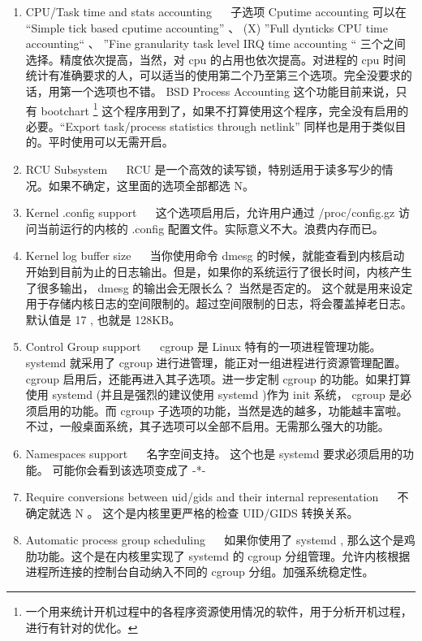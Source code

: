 \begin{enumerate}
\item CPU/Task time and stats accounting ~~ 子选项 Cputime accounting 可以在  “Simple tick based cputime accounting”    、   (X) ”Full dynticks CPU time accounting“      、 ”Fine granularity task level IRQ time accounting “ 三个之间选择。精度依次提高，当然，对 cpu 的占用也依次提高。对进程的 cpu 时间统计有准确要求的人，可以适当的使用第二个乃至第三个选项。完全没要求的话，用第一个选项也不错。
BSD Process Accounting 这个功能目前来说，只有 bootchart \footnote{一个用来统计开机过程中的各程序资源使用情况的软件，用于分析开机过程，进行有针对的优化。} 这个程序用到了，如果不打算使用这个程序，完全没有启用的必要。“Export task/process statistics through netlink” 同样也是用于类似目的。平时使用可以无需开启。


\item RCU Subsystem ~~ RCU 是一个高效的读写锁，特别适用于读多写少的情况。如果不确定，这里面的选项全部都选 N。

\item Kernel .config support  ~~ 这个选项启用后，允许用户通过 /proc/config.gz 访问当前运行的内核的 .config 配置文件。实际意义不大。浪费内存而已。

\item Kernel log buffer size ~~  当你使用命令 dmesg 的时候，就能查看到内核启动开始到目前为止的日志输出。但是，如果你的系统运行了很长时间，内核产生了很多输出， dmesg 的输出会无限长么？ 当然是否定的。 这个就是用来设定用于存储内核日志的空间限制的。超过空间限制的日志，将会覆盖掉老日志。默认值是 17 , 也就是 128KB。

\item Control Group support ~~ cgroup 是 Linux 特有的一项进程管理功能。 systemd 就采用了 cgroup 进行进管理，能正对一组进程进行资源管理配置。cgroup 启用后，还能再进入其子选项。进一步定制 cgroup 的功能。如果打算使用 systemd (并且是强烈的建议使用 systemd )作为 init 系统， cgroup 是必须启用的功能。而 cgroup 子选项的功能，当然是选的越多，功能越丰富啦。不过，一般桌面系统，其子选项可以全部不启用。无需那么强大的功能。

\item Namespaces support ~~ 名字空间支持。 这个也是 systemd 要求必须启用的功能。 可能你会看到该选项变成了 -*- 

\item Require conversions between uid/gids and their internal representation ~~ 不确定就选 N 。 这个是内核里更严格的检查 UID/GIDS 转换关系。

\item Automatic process group scheduling ~~ 如果你使用了 systemd , 那么这个是鸡肋功能。这个是在内核里实现了 systemd 的 cgroup 分组管理。允许内核根据进程所连接的控制台自动纳入不同的 cgroup 分组。加强系统稳定性。


\end{enumerate}
